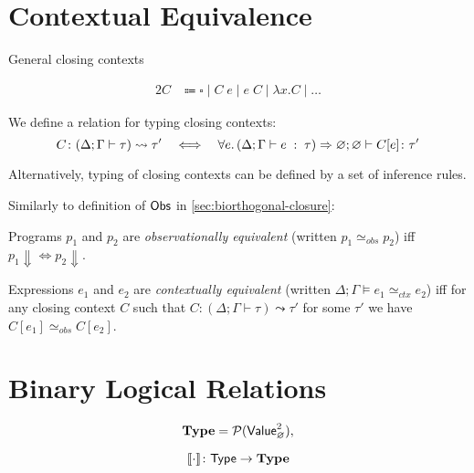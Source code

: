 \section{Contextual Equivalence}

General closing contexts

\begin{alignat*}{2}
  C & \Coloneqq \square \mid C\;e \mid e\;C \mid \lambda x.C \mid \ldots
\end{alignat*}

We define a relation for typing closing contexts:
\[
  C \colon (\Delta; \Gamma \vdash \tau) \leadsto \tau'
    \quad\Longleftrightarrow\quad
    \forall e\ldotp (\Delta; \Gamma \vdash e \;:\;\tau) \Rightarrow
      \varnothing;\varnothing \vdash C[e] \colon \tau'
\]

Alternatively, typing of closing contexts can be defined by
a set of inference rules.

Similarly to definition of $\mathsf{Obs}$ in \autoref{sec:biorthogonal-closure}:

\begin{defin}
  Programs $p_1$ and $p_2$ are \emph{observationally equivalent}
  (written $p_1 \simeq_{obs} p_2$)
  iff $p_1 \Downarrow \iff p_2 \Downarrow$.
\end{defin}

\begin{defin}
  Expressions $e_1$ and $e_2$ are \emph{contextually equivalent}
  (written $\Delta; \Gamma \models e_1 \simeq_{ctx} e_2$)
  iff for any closing context $C$ such that $C : (\Delta;\Gamma\vdash\tau) \leadsto \tau'$
  for some $\tau'$
  we have $C[e_1] \simeq_{obs} C[e_2]$.
\end{defin}

\section{Binary Logical Relations}
\[
  \textbf{Type} = \mathcal{P}(\mathsf{Value}_{\varnothing}^2),
\]

\[
  \llbracket\cdot\rrbracket \colon \mathsf{Type} \to \textbf{Type}
\]

